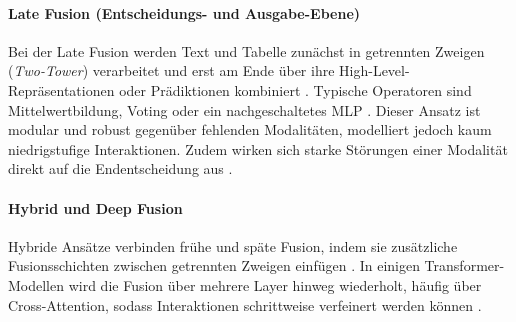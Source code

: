 \paragraph{Late Fusion (Entscheidungs- und Ausgabe-Ebene)}
Bei der Late Fusion werden Text und Tabelle zunächst in getrennten Zweigen (\textit{Two-Tower}) verarbeitet und erst am Ende über ihre High-Level-Repräsentationen oder Prädiktionen kombiniert \cite{Li2024}. Typische Operatoren sind Mittelwertbildung, Voting oder ein nachgeschaltetes MLP \cite{Baltrusaitis2019}. Dieser Ansatz ist modular und robust gegenüber fehlenden Modalitäten, modelliert jedoch kaum niedrigstufige Interaktionen. Zudem wirken sich starke Störungen einer Modalität direkt auf die Endentscheidung aus \cite{Baltrusaitis2019}.

\paragraph{Hybrid und Deep Fusion}
Hybride Ansätze verbinden frühe und späte Fusion, indem sie zusätzliche Fusionsschichten zwischen getrennten Zweigen einfügen \cite{Jiao2024, Baltrusaitis2019, Li2024}. In einigen Transformer-Modellen wird die Fusion über mehrere Layer hinweg wiederholt, häufig über Cross-Attention, sodass Interaktionen schrittweise verfeinert werden können \cite{Jiao2024, Li2024}.
